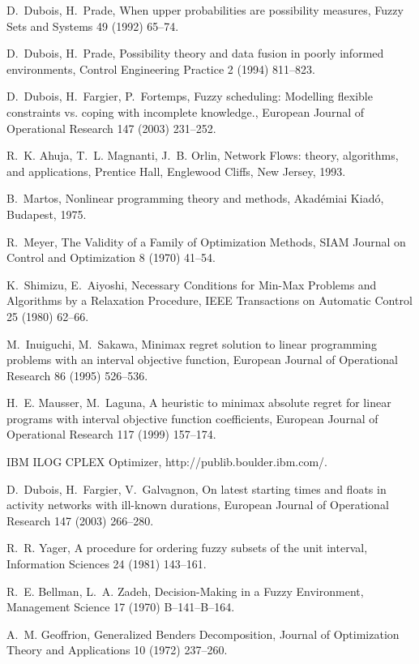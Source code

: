 \documentclass[11pt]{article}
\begin{document}
\begin{thebibliography}{10}
D.~Dubois, H.~Prade, When upper probabilities are possibility measures, Fuzzy
  Sets and Systems 49 (1992) 65--74.

D.~Dubois, H.~Prade, Possibility theory and data fusion in poorly informed
  environments, Control Engineering Practice 2 (1994) 811--823.

D.~Dubois, H.~Fargier, P.~Fortemps, Fuzzy scheduling: Modelling flexible
  constraints vs. coping with incomplete knowledge., European Journal of
  Operational Research 147 (2003) 231--252.

R.~K. Ahuja, T.~L. Magnanti, J.~B. Orlin, Network Flows: theory, algorithms,
  and applications, Prentice Hall, Englewood Cliffs, New Jersey, 1993.

B.~Martos, Nonlinear programming theory and methods, Akad{\'e}miai Kiad{\'o},
  Budapest, 1975.

R.~Meyer, {T}he {V}alidity of a {F}amily of {O}ptimization {M}ethods, SIAM
  Journal on Control and Optimization 8 (1970) 41--54.

K.~Shimizu, E.~Aiyoshi, {N}ecessary {C}onditions for {M}in-{M}ax {P}roblems and
  {A}lgorithms by a {R}elaxation {P}rocedure, IEEE Transactions on Automatic
  Control 25 (1980) 62--66.

M.~Inuiguchi, M.~Sakawa, Minimax regret solution to linear programming problems
  with an interval objective function, European Journal of Operational Research
  86 (1995) 526--536.

H.~E. Mausser, M.~Laguna, A heuristic to minimax absolute regret for linear
  programs with interval objective function coefficients, European Journal of
  Operational Research 117 (1999) 157--174.

{IBM ILOG CPLEX O}ptimizer, {http://publib.boulder.ibm.com/}.

D.~Dubois, H.~Fargier, V.~Galvagnon, On latest starting times and floats in
  activity networks with ill-known durations, European Journal of Operational
  Research 147 (2003) 266--280.

R.~R. Yager, A procedure for ordering fuzzy subsets of the unit interval,
  Information Sciences 24 (1981) 143--161.

R.~E. Bellman, L.~A. Zadeh, Decision-{M}aking in a {F}uzzy {E}nvironment,
  Management Science 17 (1970) B--141--B--164.

A.~M. Geoffrion, {G}eneralized {B}enders {D}ecomposition, Journal of
  Optimization Theory and Applications 10 (1972) 237--260.

\end{thebibliography}
\end{document}
